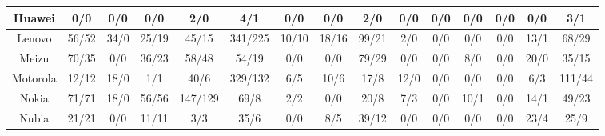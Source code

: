 \begin{table*}[t]
\begin{threeparttable}
{\begin{tabular}{|c|ccccccc|ccccccc|}
Huawei                 & \multicolumn{1}{c|}{0/0}      & \multicolumn{1}{c|}{0/0}    & \multicolumn{1}{c|}{0/0}     & \multicolumn{1}{c|}{2/0}      & \multicolumn{1}{c|}{4/1}       & \multicolumn{1}{c|}{0/0}      & 0/0     & \multicolumn{1}{c|}{2/0}      & \multicolumn{1}{c|}{0/0}     & \multicolumn{1}{c|}{0/0}  & \multicolumn{1}{c|}{0/0}     & \multicolumn{1}{c|}{0/0}  & \multicolumn{1}{c|}{0/0}      & 3/1      \\ \hline
Lenovo                 & \multicolumn{1}{c|}{56/52}    & \multicolumn{1}{c|}{34/0}   & \multicolumn{1}{c|}{25/19}   & \multicolumn{1}{c|}{45/15}    & \multicolumn{1}{c|}{341/225}   & \multicolumn{1}{c|}{10/10}    & 18/16   & \multicolumn{1}{c|}{99/21}    & \multicolumn{1}{c|}{2/0}     & \multicolumn{1}{c|}{0/0}  & \multicolumn{1}{c|}{0/0}     & \multicolumn{1}{c|}{0/0}  & \multicolumn{1}{c|}{13/1}     & 68/29    \\ \hline
Meizu                  & \multicolumn{1}{c|}{70/35}    & \multicolumn{1}{c|}{0/0}    & \multicolumn{1}{c|}{36/23}   & \multicolumn{1}{c|}{58/48}    & \multicolumn{1}{c|}{54/19}     & \multicolumn{1}{c|}{0/0}      & 0/0     & \multicolumn{1}{c|}{79/29}    & \multicolumn{1}{c|}{0/0}     & \multicolumn{1}{c|}{0/0}  & \multicolumn{1}{c|}{8/0}     & \multicolumn{1}{c|}{0/0}  & \multicolumn{1}{c|}{20/0}     & 35/15    \\ \hline
Motorola               & \multicolumn{1}{c|}{12/12}    & \multicolumn{1}{c|}{18/0}   & \multicolumn{1}{c|}{1/1}     & \multicolumn{1}{c|}{40/6}     & \multicolumn{1}{c|}{329/132}   & \multicolumn{1}{c|}{6/5}      & 10/6    & \multicolumn{1}{c|}{17/8}     & \multicolumn{1}{c|}{12/0}    & \multicolumn{1}{c|}{0/0}  & \multicolumn{1}{c|}{0/0}     & \multicolumn{1}{c|}{0/0}  & \multicolumn{1}{c|}{6/3}      & 111/44   \\ \hline
Nokia                  & \multicolumn{1}{c|}{71/71}    & \multicolumn{1}{c|}{18/0}   & \multicolumn{1}{c|}{56/56}   & \multicolumn{1}{c|}{147/129}  & \multicolumn{1}{c|}{69/8}      & \multicolumn{1}{c|}{2/2}      & 0/0     & \multicolumn{1}{c|}{20/8}     & \multicolumn{1}{c|}{7/3}     & \multicolumn{1}{c|}{0/0}  & \multicolumn{1}{c|}{10/1}    & \multicolumn{1}{c|}{0/0}  & \multicolumn{1}{c|}{14/1}     & 49/23    \\ \hline
Nubia                  & \multicolumn{1}{c|}{21/21}    & \multicolumn{1}{c|}{0/0}    & \multicolumn{1}{c|}{11/11}   & \multicolumn{1}{c|}{3/3}      & \multicolumn{1}{c|}{35/6}      & \multicolumn{1}{c|}{0/0}      & 8/5     & \multicolumn{1}{c|}{39/12}    & \multicolumn{1}{c|}{0/0}     & \multicolumn{1}{c|}{0/0}  & \multicolumn{1}{c|}{0/0}     & \multicolumn{1}{c|}{0/0}  & \multicolumn{1}{c|}{23/4}     & 25/9     \\ \hline

\end{tabular}}
\end{threeparttable}
\end{table*}
